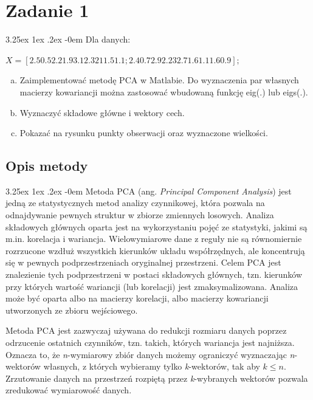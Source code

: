 \documentclass[11pt, a4paper]{article}
\date{\today}
\makeatletter
\newcommand{\fbi}{\leavevmode{\parindent=1em\indent}}
\renewcommand\paragraph{\@startsection{paragraph}{5}{\z@}
  {3.25ex \@plus1ex \@minus.2ex}
  {-0em}
  {\normalfont\normalsize\bfseries}}
\makeatother
\begin{document}


\tableofcontents

\newpage

\section{Zadanie 1}
\paragraph{}
Dla danych:
\begin{center}
\(X = [2.5 0.5 2.2 1.9 3.1 2.3 2 1 1.5 1.1; 2.4 0.7 2.9 2.2 3 2.7 1.6 1.1 1.6 0.9];\)
\end{center}
\begin{enumerate}[a.]
	\item Zaimplementować metodę PCA w Matlabie. Do wyznaczenia par własnych macierzy kowariancji można zastosować wbudowaną funkcję eig(.) lub eigs(.).
	\item Wyznaczyć składowe główne i wektory cech.
	\item Pokazać na rysunku punkty obserwacji oraz wyznaczone wielkości.
\end{enumerate}

\subsection{Opis metody}
\paragraph{}
Metoda PCA (ang. \textit{Principal Component Analysis}) jest jedną ze statystycznych metod analizy czynnikowej, która pozwala na odnajdywanie pewnych struktur w zbiorze zmiennych losowych. Analiza składowych głównych oparta jest na wykorzystaniu pojęć ze statystyki, jakimi są m.in. korelacja i wariancja. Wielowymiarowe dane z reguły nie są równomiernie rozrzucone wzdłuż wszystkich kierunków układu współrzędnych, ale koncentrują się w pewnych podprzestrzeniach oryginalnej przestrzeni. Celem PCA jest znalezienie tych podprzestrzeni w postaci składowych głównych, tzn. kierunków przy których wartość wariancji (lub korelacji) jest zmaksymalizowana. Analiza może być oparta albo na macierzy korelacji, albo macierzy kowariancji utworzonych ze zbioru wejściowego.

\fbi
Metoda PCA jest zazwyczaj używana do redukcji rozmiaru danych poprzez odrzucenie ostatnich czynników, tzn. takich, których wariancja jest najniższa. Oznacza to, że \textit{n}-wymiarowy zbiór danych możemy ograniczyć wyznaczając \textit{n}-wektorów własnych, z których wybieramy tylko \textit{k}-wektorów, tak aby $k \le n$. Zrzutowanie danych na przestrzeń rozpiętą przez \textit{k}-wybranych wektorów pozwala zredukować wymiarowość danych.
\end{document}

